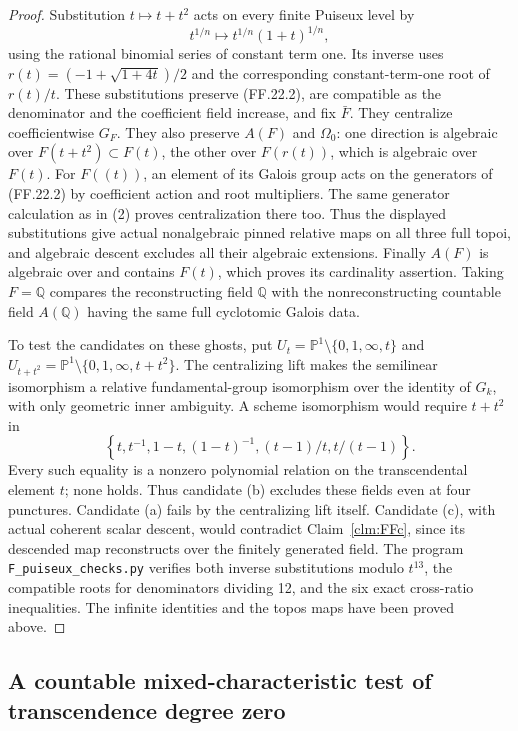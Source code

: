 \begin{proof}
Substitution \(t\mapsto t+t^2\) acts on every finite
Puiseux level by
\[
 t^{1/n}\longmapsto t^{1/n}(1+t)^{1/n},
\]
using the rational binomial series of constant term one.
Its inverse uses
\(r(t)=(-1+\sqrt{1+4t})/2\) and the corresponding
constant-term-one root of \(r(t)/t\). These substitutions
preserve (FF.22.2), are compatible as the denominator and
the coefficient field increase, and fix \(\bar F\).
They centralize coefficientwise \(G_F\). They also
preserve \(A(F)\) and \(\Omega_0\): one direction is
algebraic over \(F(t+t^2)\subset F(t)\), the other over
\(F(r(t))\), which is algebraic over \(F(t)\).
For \(F((t))\), an element of its Galois group acts on
the generators of (FF.22.2) by coefficient action and
root multipliers. The same generator calculation as in
(2) proves centralization there too. Thus the displayed
substitutions give actual nonalgebraic pinned relative
maps on all three full topoi, and algebraic descent
excludes all their algebraic extensions. Finally \(A(F)\)
is algebraic over and contains \(F(t)\), which proves
its cardinality assertion. Taking \(F=\mathbb Q\)
compares the reconstructing field \(\mathbb Q\) with
the nonreconstructing countable field \(A(\mathbb Q)\)
having the same full cyclotomic Galois data.

To test the candidates on these ghosts, put
\(U_t=\mathbb P^1\setminus\{0,1,\infty,t\}\)
and \(U_{t+t^2}=\mathbb P^1\setminus
\{0,1,\infty,t+t^2\}\). The centralizing lift makes
the semilinear isomorphism a relative fundamental-group
isomorphism over the identity of \(G_k\), with only
geometric inner ambiguity. A scheme isomorphism would
require \(t+t^2\) in
\[
 \left\{t,t^{-1},1-t,(1-t)^{-1},
                    (t-1)/t,t/(t-1)\right\}.
\]
Every such equality is a nonzero polynomial relation on
the transcendental element \(t\); none holds. Thus
candidate (b) excludes these fields even at four punctures.
Candidate (a) fails by the centralizing lift itself.
Candidate (c), with actual coherent scalar descent,
would contradict Claim~\ref{clm:FFc}, since its descended
map reconstructs over the finitely generated field.
The program \texttt{F\_puiseux\_checks.py} verifies both
inverse substitutions modulo \(t^{13}\), the compatible
roots for denominators dividing 12, and the six exact
cross-ratio inequalities. The infinite identities and
the topos maps have been proved above.
\end{proof}

\subsection{A countable mixed-characteristic test of transcendence degree zero}

